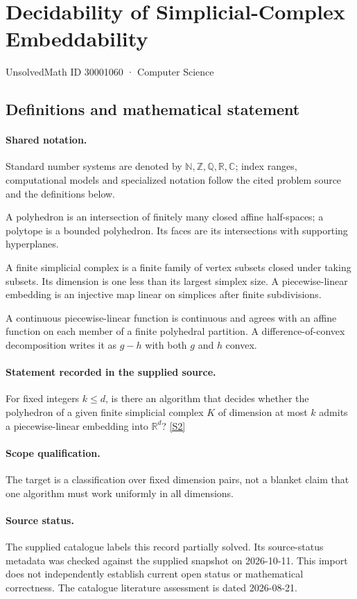 \documentclass[11pt]{article}
\newcommand{\sref}[2]{\hyperlink{source:#1:#2}{[S#2]}}
\begin{document}
\setcounter{section}{30001059}
\section{Decidability of Simplicial-Complex Embeddability}\label{30001060}
{\small\sffamily UnsolvedMath ID 30001060 · Computer Science}
\subsection{Definitions and mathematical statement}

\paragraph{Shared notation.}Standard number systems are denoted by $\mathbb N,\mathbb Z,\mathbb Q,\mathbb R,\mathbb C$; index ranges, computational models and specialized notation follow the cited problem source and the definitions below.


A polyhedron is an intersection of finitely many closed affine half-spaces; a polytope is a bounded polyhedron. Its faces are its intersections with supporting hyperplanes.

A finite simplicial complex is a finite family of vertex subsets closed under taking subsets. Its dimension is one less than its largest simplex size. A piecewise-linear embedding is an injective map linear on simplices after finite subdivisions.

A continuous piecewise-linear function is continuous and agrees with an affine function on each member of a finite polyhedral partition. A difference-of-convex decomposition writes it as $g-h$ with both $g$ and $h$ convex.
\paragraph{Statement recorded in the supplied source.}
For fixed integers $k\leq d$, is there an algorithm that decides whether the polyhedron of a given finite simplicial complex $K$ of dimension at most $k$ admits a piecewise-linear embedding into $\mathbb R^d$? \sref{30001060}{2}
\paragraph{Scope qualification.}
The target is a classification over fixed dimension pairs, not a blanket claim that one algorithm must work uniformly in all dimensions.
\paragraph{Source status.}
The supplied catalogue labels this record partially solved. Its source-status metadata was checked against the supplied snapshot on 2026-10-11. This import does not independently establish current open status or mathematical correctness. The catalogue literature assessment is dated 2026-08-21.
\end{document}
